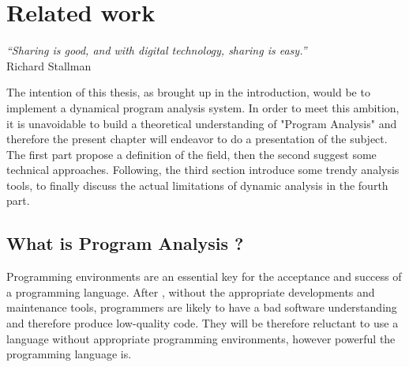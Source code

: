 
\chapter{Related work}
\label{chap:relatedwork}
\begin{flushright}
\textit{``Sharing is good, and with digital technology, sharing is easy.''} \\ Richard Stallman
\end{flushright}

The intention of this thesis, as brought up in the introduction, would be to implement a dynamical program analysis system. In order to meet this ambition, it is unavoidable to build a theoretical understanding of "Program Analysis" and therefore the present chapter will endeavor to do a presentation of the subject. The first part propose a definition of the field, then the second suggest some technical approaches. Following, the third section introduce some trendy analysis tools, to finally discuss the actual limitations of dynamic analysis in the fourth part.

\section{What is Program Analysis ?} 
Programming environments are an essential key for the acceptance and success of a programming language. After \cite{Ducasse1994}, without the appropriate developments and maintenance tools, programmers are likely to have a bad software understanding and therefore produce low-quality code. They will be therefore reluctant to use a language without appropriate programming environments, however powerful the programming language is.

